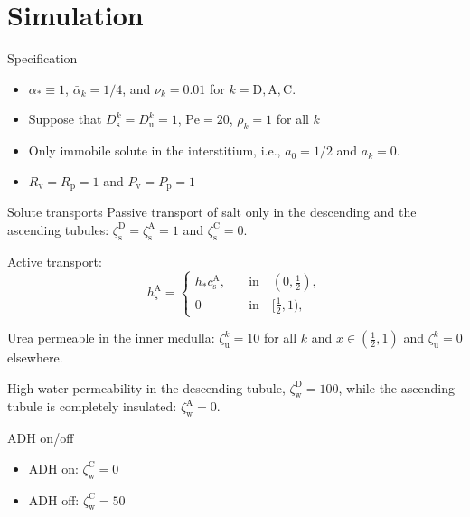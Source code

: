 \documentclass{beamer}
\begin{document}
\section{Simulation}

\begin{frame}{Specification}
    \begin{itemize}
        \item $\alpha_* \equiv 1$, $\bar{\alpha}_k = 1/4$, and $\nu_k = 0.01$ for $k=\mathrm{D},\mathrm{A},\mathrm{C}$.
        \item Suppose that $D_\mathrm{s}^k = D_{\mathrm{u}}^k = 1$, $\mathrm{Pe} = 20$, $\rho_k = 1$ for all $k$
        \item Only immobile solute in the interstitium, i.e., $a_0 = 1/2$ and $a_k = 0$.
        \item $R_\mathrm{v} = R_\mathrm{p} = 1$ and $P_\mathrm{v} = P_\mathrm{p} = 1$
    \end{itemize}
\end{frame}

\begin{frame}{Solute transports}
    Passive transport of salt only in the descending and the ascending tubules: $\zeta_{\mathrm{s}}^\mathrm{D} = \zeta_{\mathrm{s}}^\mathrm{A} = 1$ and $\zeta_{\mathrm{s}}^\mathrm{C} = 0$.

    \pause
    Active transport:
    \begin{equation}
        h_\mathrm{s}^\mathrm{A} = \begin{cases}
            h_*c_\mathrm{s}^\mathrm{A},\quad  &\text{in}\quad (0,\frac{1}{2}),\\
            0\quad &\text{in}\quad [\frac{1}{2},1),
        \end{cases}
    \end{equation}

    \pause
    Urea permeable in the inner medulla: $\zeta_{\mathrm{u}}^k = 10$ for all $k$ and $x\in (\frac{1}{2},1)$ and $\zeta_{\mathrm{u}}^k =0$ elsewhere.

    \pause
    High water permeability in the descending tubule, $\zeta_\mathrm{w}^\mathrm{D} = 100$, while the ascending tubule is completely insulated: $\zeta_\mathrm{w}^\mathrm{A} = 0$.
\end{frame}

\begin{frame}{ADH on/off}
    \begin{itemize}
        \item ADH on: $\zeta_{\mathrm{w}}^\mathrm{C} = 0$
        \item ADH off: $\zeta_{\mathrm{w}}^\mathrm{C} = 50$
    \end{itemize}
\end{frame}
\end{document}
